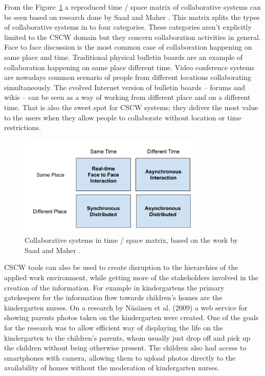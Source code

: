 From the Figure~\ref{fig:cscw-matrix} a reproduced time / space matrix of collaborative systems can be seen based on research done by Saad and Maher \cite{saad_shared_1996}. This matrix splits the types of collaborative systems in to four categories. These categories aren't explicitly limited to the CSCW domain but they concern collaboration activities in general. Face to face discussion is the most common case of collaboration happening on same place and time. Traditional physical bulletin boards are an example of collaboration happening on same place different time. Video conference systems are nowadays common scenario of people from different locations collaborating simultaneously. The evolved Internet version of bulletin boards – forums and wikis – can be seen as a way of working from different place and on a different time. That is also the sweet spot for CSCW systems; they deliver the most value to the users when they allow people to collaborate without location or time restrictions. %

\begin{figure}[t]
\begin{center}
\includegraphics[width=0.8\textwidth]{assets/cscw-matrix.png}
\end{center}
\caption{Collaborative systems in time / space matrix, based on the work by Saad and Maher \cite{saad_shared_1996}.}
\label{fig:cscw-matrix}
\end{figure}


CSCW tools can also be used to create disruption to the hierarchies of the applied work environment, while getting more of the stakeholders involved in the creation of the information. For example in kindergartens the primary gatekeepers for the information flow towards children's homes are the kindergarten nurses. On a research by Näsänen et al. (2009) a web service for showing parents photos taken on the kindergarten were created. One of the goals for the research was to allow efficient way of displaying the life on the kindergarten to the children's parents, whom usually just drop off and pick up the children without being otherwise present. The children also had access to smartphones with camera, allowing them to upload photos directly to the availability of homes without the moderation of kindergarten nurses. \cite{nasanen_mobile_2009}

